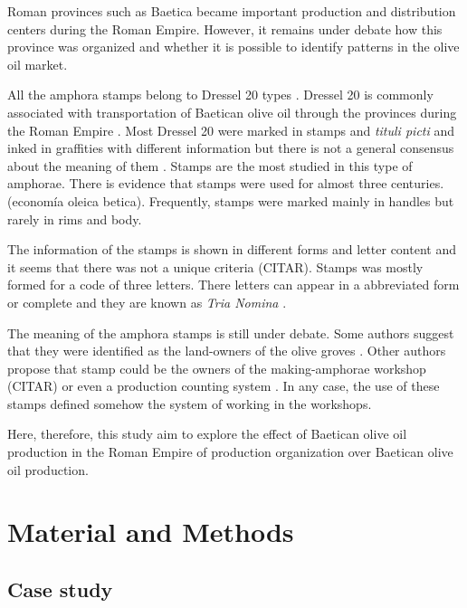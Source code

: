\documentclass[review]{elsarticle}
\begin{document}
Roman provinces such as Baetica became important production and distribution centers during the Roman Empire. However, it remains under debate how this province was organized and whether it is possible to identify patterns in the olive oil market. 


All the amphora stamps belong to Dressel 20 types \citep{dressel,martin-kilcher_romischen_1994}. Dressel 20 is commonly associated with transportation of Baetican olive oil through the provinces during the Roman Empire \citep{berni_millet_epigrafianforica_2008}. Most Dressel 20 were marked in stamps and \textit{tituli picti} and inked in graffities with different information but there is not a general consensus about the meaning of them \citep{rodriguez_baetican_1998}. Stamps are the most studied in this type of amphorae. There is evidence that stamps were used for almost three centuries. (economía oleica betica). Frequently, stamps were marked mainly in handles but rarely in rims and body. 

The information of the stamps is shown in different forms and letter content and it seems that there was not a unique criteria (CITAR). Stamps was mostly formed for a code of three letters. There letters can appear in a abbreviated form or complete and they are known as \textit{Tria Nomina} \citep{berni_millet_amphora_1996}. 


The meaning of the amphora stamps is still under debate. Some authors suggest that they were identified as the land-owners of the olive groves \citep{rodriguez_economioleicola_1977}. Other authors propose that stamp could be the owners of the making-amphorae workshop (CITAR) or even a production counting system \citep{berni_millet_epigrafianforica_2008}. In any case, the use of these stamps defined somehow the system of working in the workshops. 

Here, therefore, this study aim to explore the effect of Baetican olive oil production in the Roman Empire
of production organization over Baetican olive oil production. 


\section{Material and Methods}

\subsection{Case study}
\end{document}
